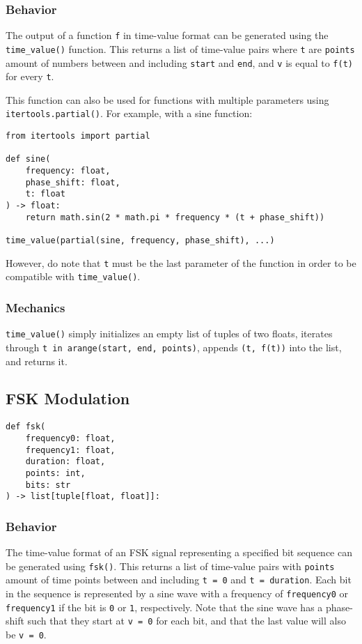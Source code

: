 \documentclass{article}
\begin{document}
			\subsubsection{Behavior}
				The output of a function \verb|f| in time-value format can be generated using
				the \verb|time_value()| function. This returns a list of time-value pairs where
				\verb|t| are \verb|points| amount of numbers between and including \verb|start| and \verb|end|,
				and \verb|v| is equal to \verb|f(t)| for every \verb|t|.

				This function can also be used for functions with multiple parameters using
				\verb|itertools.partial()|. For example, with a sine function:

				\begin{verbatim}
from itertools import partial

def sine(
	frequency: float,
	phase_shift: float,
	t: float
) -> float:
	return math.sin(2 * math.pi * frequency * (t + phase_shift))

time_value(partial(sine, frequency, phase_shift), ...)
				\end{verbatim}

				However, do note that \verb|t| must be the last parameter of the function in order to be
				compatible with \verb|time_value()|.

			\subsubsection{Mechanics}
				\verb|time_value()| simply initializes an empty list of tuples of two floats, iterates through
				\verb|t in arange(start, end, points)|, appends \verb|(t, f(t))| into the list, and returns it.

			\pagebreak



		\subsection{FSK Modulation}
			\begin{verbatim}
def fsk(
	frequency0: float,
	frequency1: float,
	duration: float,
	points: int,
	bits: str
) -> list[tuple[float, float]]:
			\end{verbatim}

			\subsubsection{Behavior}
				The time-value format of an FSK signal representing a specified bit sequence
				can be generated using \verb|fsk()|. This returns a list of time-value pairs with \verb|points|
				amount of time points between and including \verb|t = 0| and \verb|t = duration|. Each bit in
				the sequence is represented by a sine wave with a frequency of \verb|frequency0| or \verb|frequency1|
				if the bit is \verb|0| or \verb|1|, respectively. Note that the sine wave has a phase-shift
				such that they start at \verb|v = 0| for each bit, and that the last value will also be \verb|v = 0|.
\end{document}

